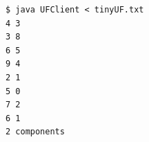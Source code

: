 \documentclass[8pt,a4paper,compress]{beamer}
\begin{document}
\begin{frame}[fragile]
\begin{minipage}{250pt}
\begin{lstlisting}[language={}]
$ java UFClient < tinyUF.txt 
4 3
3 8
6 5
9 4
2 1
5 0
7 2
6 1
2 components
\end{lstlisting}
\end{minipage}%
\begin{minipage}{60pt}
\hfill {}
\end{minipage}
\end{frame}
\end{document}
